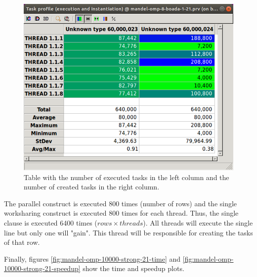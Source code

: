 \documentclass[12pt, a4paper]{article}
\begin{document}
\begin{figure}[H]
	\centering
	\includegraphics[scale=0.40]{./S2_OMP_tasks_table}
	\caption{Table with the number of executed tasks in the left column and the number of created tasks in the right column.}
	\label{fig:S2_OMP_tasks_table}
\end{figure}

The parallel construct is executed 800 times (number of rows) and the single worksharing construct is executed 800 times for each thread. Thus, the single clause is executed 6400 times ($rows \times threads$). All threads will execute the single line but only one will "gain". This thread will be responsible for creating the tasks of that row.

Finally, figures \ref{fig:mandel-omp-10000-strong-21-time} and \ref{fig:mandel-omp-10000-strong-21-speedup} show the time and speedup plots.
\end{document}
